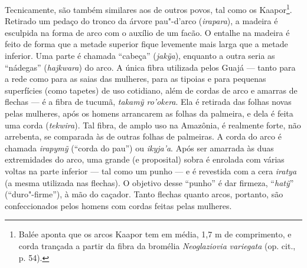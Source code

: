 Tecnicamente, são também similares aos de outros povos, tal como os
Kaapor\footnote{Balée aponta que os arcos Kaapor tem em média, 1,7 m de
  comprimento, e corda trançada a partir da fibra da bromélia
  \emph{Neoglaziovia} \emph{variegata} (op. cit., p. 54).}. Retirado um
pedaço do tronco da árvore pau"-d'arco (\emph{irapara}), a madeira é
esculpida na forma de arco com o auxílio de um facão. O entalhe na
madeira é feito de forma que a metade superior fique levemente mais
larga que a metade inferior. Uma parte é chamada ``cabeça''
(\emph{jakỹa}), enquanto a outra seria as ``nádegas'' (\emph{hajkwara}) do
arco. A única fibra utilizada pelos Guajá --- tanto para a rede como para
as saias das mulheres, para as tipoias e para pequenas superfícies (como
tapetes) de uso cotidiano, além de cordas de arco e amarras de flechas ---
é a fibra de tucumã, \emph{takamỹ ro'okera}. Ela é retirada das folhas
novas pelas mulheres, após os homens arrancarem as folhas da palmeira, e
dela é feita uma corda (\emph{tekwira}). Tal fibra, de amplo uso na
Amazônia, é realmente forte, não arrebenta, se comparada às de outras
folhas de palmeiras. A corda do arco é chamada \emph{irapymỹ} (``corda do
pau'') ou \emph{ikyja'a}. Após ser amarrada às duas extremidades do arco,
uma grande (e proposital) sobra é enrolada com várias voltas na parte
inferior --- tal como um punho --- e é revestida com a cera \emph{iratya} (a
mesma utilizada nas flechas). O objetivo desse ``punho'' é dar firmeza,
``\emph{hatỹ}'' (``duro"-firme''), à mão do caçador. Tanto flechas quanto
arcos, portanto, são confeccionados pelos homens com cordas feitas pelas
mulheres.

